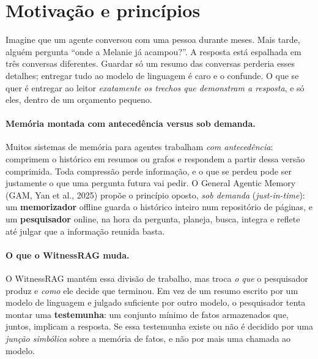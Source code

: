 \documentclass[11pt]{article}
\begin{document}
\section{Motivação e princípios}\label{sec:motivacao}

\begin{intuicao}
Imagine que um agente conversou com uma pessoa durante meses. Mais tarde,
alguém pergunta ``onde a Melanie já acampou?''. A resposta está espalhada em
três conversas diferentes. Guardar só um resumo das conversas perderia esses
detalhes; entregar tudo ao modelo de linguagem é caro e o confunde. O que se
quer é entregar ao leitor \emph{exatamente os trechos que demonstram a
resposta}, e só eles, dentro de um orçamento pequeno.
\end{intuicao}

\paragraph{Memória montada com antecedência versus sob demanda.}
Muitos sistemas de memória para agentes trabalham \emph{com antecedência}:
comprimem o histórico em resumos ou grafos e respondem a partir dessa versão
comprimida. Toda compressão perde informação, e o que se perdeu pode ser
justamente o que uma pergunta futura vai pedir. O General Agentic Memory
(GAM, Yan et al., 2025) propõe o princípio oposto, \emph{sob demanda}
(\emph{just-in-time}): um \textbf{memorizador} offline guarda o histórico
inteiro num repositório de páginas, e um \textbf{pesquisador} online, na hora
da pergunta, planeja, busca, integra e reflete até julgar que a informação
reunida basta.

\paragraph{O que o WitnessRAG muda.}
O WitnessRAG mantém essa divisão de trabalho, mas troca \emph{o que} o
pesquisador produz e \emph{como} ele decide que terminou. Em vez de um resumo
escrito por um modelo de linguagem e julgado suficiente por outro modelo, o
pesquisador tenta montar uma \textbf{testemunha}: um conjunto mínimo de fatos
armazenados que, juntos, implicam a resposta. Se essa testemunha existe ou
não é decidido por uma \emph{junção simbólica} sobre a memória de fatos, e
não por mais uma chamada ao modelo.
\end{document}
